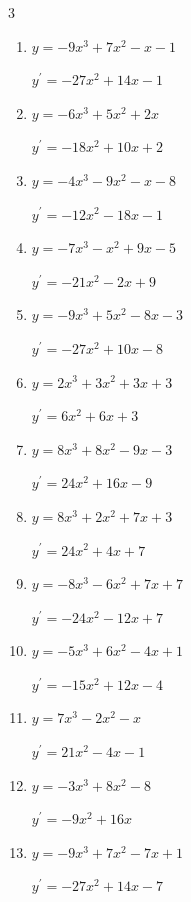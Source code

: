 \begin{multicols}{3}
\begin{enumerate}
  \item $y=-9x^{3}+7x^{2}-x-1$

        $\displaystyle y^{\prime}=-27x^{2}+14x-1$

  \item $y=-6x^{3}+5x^{2}+2x$

        $\displaystyle y^{\prime}=-18x^{2}+10x+2$

  \item $y=-4x^{3}-9x^{2}-x-8$

        $\displaystyle y^{\prime}=-12x^{2}-18x-1$

  \item $y=-7x^{3}-x^{2}+9x-5$

        $\displaystyle y^{\prime}=-21x^{2}-2x+9$

  \item $y=-9x^{3}+5x^{2}-8x-3$

        $\displaystyle y^{\prime}=-27x^{2}+10x-8$

  \item $y=2x^{3}+3x^{2}+3x+3$

        $\displaystyle y^{\prime}=6x^{2}+6x+3$

  \item $y=8x^{3}+8x^{2}-9x-3$

        $\displaystyle y^{\prime}=24x^{2}+16x-9$

  \item $y=8x^{3}+2x^{2}+7x+3$

        $\displaystyle y^{\prime}=24x^{2}+4x+7$

\columnbreak %

  \item $y=-8x^{3}-6x^{2}+7x+7$

        $\displaystyle y^{\prime}=-24x^{2}-12x+7$

  \item $y=-5x^{3}+6x^{2}-4x+1$

        $\displaystyle y^{\prime}=-15x^{2}+12x-4$

  \item $y=7x^{3}-2x^{2}-x$

        $\displaystyle y^{\prime}=21x^{2}-4x-1$

  \item $y=-3x^{3}+8x^{2}-8$

        $\displaystyle y^{\prime}=-9x^{2}+16x$

  \item $y=-9x^{3}+7x^{2}-7x+1$

        $\displaystyle y^{\prime}=-27x^{2}+14x-7$


\end{enumerate}
\end{multicols}
